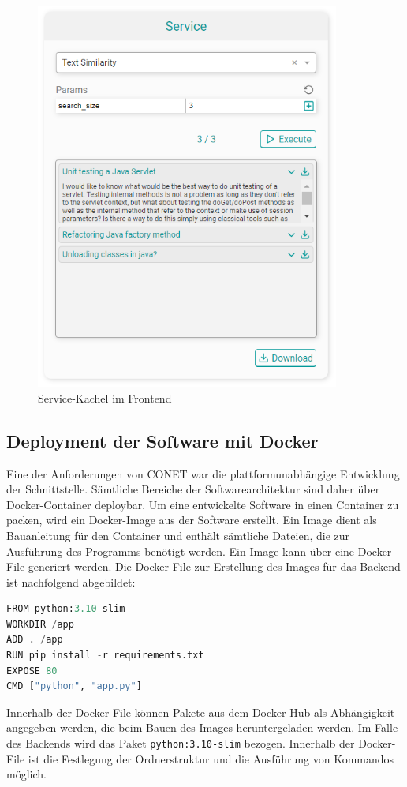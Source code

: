\begin{figure}[H]
  \centering
    \includegraphics[width = 10cm]{bilder/websiteService}
    \caption{Service-Kachel im Frontend}
\end{figure}

\subsection{Deployment der Software mit Docker}
Eine der Anforderungen von CONET war die plattformunabhängige Entwicklung der Schnittstelle. Sämtliche Bereiche der Softwarearchitektur sind daher über Docker-Container deploybar. Um eine entwickelte Software in einen Container zu packen, wird ein Docker-Image aus der Software erstellt. Ein Image dient als Bauanleitung für den Container und enthält sämtliche Dateien, die zur Ausführung des Programms benötigt werden. Ein Image kann über eine Docker-File generiert werden. Die Docker-File zur Erstellung des Images für das Backend ist nachfolgend abgebildet:

\begin{lstlisting}[language=Python, caption={Beispiel einer Dockefile}]
FROM python:3.10-slim
WORKDIR /app
ADD . /app
RUN pip install -r requirements.txt
EXPOSE 80
CMD ["python", "app.py"]
\end{lstlisting}

Innerhalb der Docker-File können Pakete aus dem Docker-Hub als Abhängigkeit angegeben werden, die beim Bauen des Images heruntergeladen werden. Im Falle des Backends wird das Paket \texttt{python:3.10-slim} bezogen. Innerhalb der Docker-File ist die Festlegung der Ordnerstruktur und die Ausführung von Kommandos möglich.

